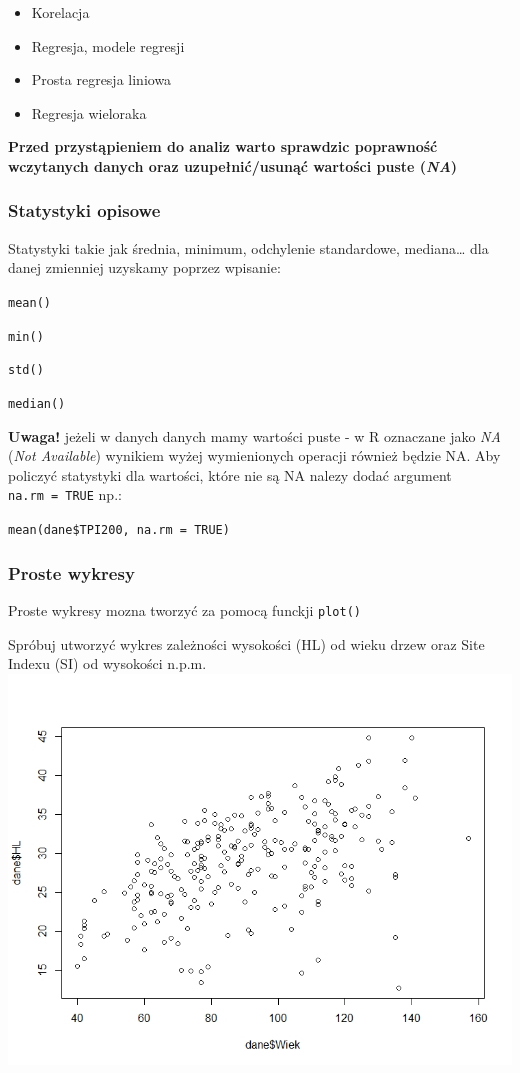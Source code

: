 \documentclass[]{article}
\providecommand{\tightlist}{%
  \setlength{\itemsep}{0pt}\setlength{\parskip}{0pt}}
\begin{document}
\begin{itemize}
\tightlist
\item
  Korelacja
\item
  Regresja, modele regresji
\item
  Prosta regresja liniowa
\item
  Regresja wieloraka
\end{itemize}

\textbf{Przed przystąpieniem do analiz warto sprawdzic poprawność
wczytanych danych oraz uzupełnić/usunąć wartości puste (\emph{NA})}

\subsubsection{Statystyki opisowe}\label{statystyki-opisowe}

Statystyki takie jak średnia, minimum, odchylenie standardowe,
mediana\ldots{} dla danej zmienniej uzyskamy poprzez wpisanie:

\texttt{mean()}

\texttt{min()}

\texttt{std()}

\texttt{median()}

\textbf{Uwaga!} jeżeli w danych danych mamy wartości puste - w R
oznaczane jako \emph{NA} (\emph{Not Available}) wynikiem wyżej
wymienionych operacji również będzie NA. Aby policzyć statystyki dla
wartości, które nie są NA nalezy dodać argument \texttt{na.rm\ =\ TRUE}
np.:

\texttt{mean(dane\$TPI200,\ na.rm\ =\ TRUE)}

\subsubsection{Proste wykresy}\label{proste-wykresy}

Proste wykresy mozna tworzyć za pomocą funckji \texttt{plot()}

Spróbuj utworzyć wykres zależności wysokości (HL) od wieku drzew oraz
Site Indexu (SI) od wysokości n.p.m. \includegraphics{plot1.jpeg}
\end{document}
